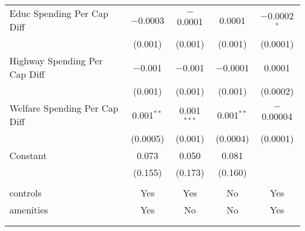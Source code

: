 \begin{table}[!htbp]
\begin{tabular}{@{\extracolsep{5pt}}lcccc}
  Educ Spending Per Cap Diff & $-$0.0003 & $-$0.0001 & 0.0001 & $-$0.0002$^{*}$ \\ 
  & (0.001) & (0.001) & (0.001) & (0.0001) \\ 
  Highway Spending Per Cap Diff & $-$0.001 & $-$0.001 & $-$0.0001 & 0.0001 \\ 
  & (0.001) & (0.001) & (0.001) & (0.0002) \\ 
  Welfare Spending Per Cap Diff & 0.001$^{**}$ & 0.001$^{***}$ & 0.001$^{**}$ & $-$0.00004 \\ 
  & (0.0005) & (0.001) & (0.0004) & (0.0001) \\ 
  Constant & 0.073 & 0.050 & 0.081 &  \\ 
  & (0.155) & (0.173) & (0.160) &  \\ 
 \hline \\[-1.8ex] 
controls & Yes & Yes & No & Yes \\ 
amenities & Yes & No & No & Yes \\ 
\hline \\[-1.8ex] 
\hline 
\hline \\[-1.8ex] 
\end{tabular} 
\end{table} 
